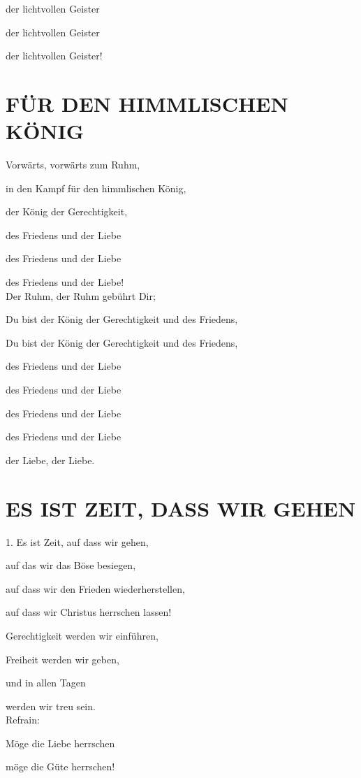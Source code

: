 \documentclass[11pt,a5paper,twoside]{article}
\begin{document}
der lichtvollen Geister

der lichtvollen Geister

der lichtvollen Geister!

\section[Für den himmlischen König]{FÜR DEN HIMMLISCHEN KÖNIG}

Vorwärts, vorwärts zum Ruhm,

in den Kampf für den himmlischen König, 

der König der Gerechtigkeit,

des Friedens und der Liebe

des Friedens und der Liebe

des Friedens und der Liebe!\\

Der Ruhm, der Ruhm gebührt Dir;

Du bist der König der Gerechtigkeit und des Friedens,

Du bist der König der Gerechtigkeit und des Friedens,

des Friedens und der Liebe

des Friedens und der Liebe

des Friedens und der Liebe

des Friedens und der Liebe

der Liebe, der Liebe.

\section[Es ist Zeit, dass wir gehen]{ES IST ZEIT, DASS WIR GEHEN}

1. Es ist Zeit, auf dass wir gehen, 

auf das wir das Böse besiegen, 

auf dass wir den Frieden wiederherstellen,

auf dass wir Christus herrschen lassen! 

Gerechtigkeit werden wir einführen, 

Freiheit werden wir geben, 

und in allen Tagen

werden wir treu sein.\\

Refrain: 

Möge die Liebe herrschen 

möge die Güte herrschen!
\end{document}
